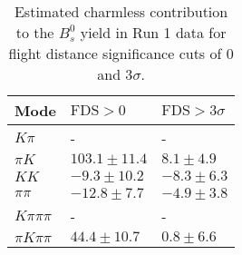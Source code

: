 \begin{table}[h]
  \centering
  \begin{tabular}{lll}
      \toprule
      Mode & $\mathrm{FDS} > 0$ & $\mathrm{FDS} > 3\sigma$ \\
      \midrule
      $K\pi$ & \-- & \-- \\
      $\pi K$ & $103.1 \pm 11.4$ & $8.1 \pm 4.9$ \\
      $KK$ & $-9.3 \pm 10.2$ & $-8.3 \pm 6.3$ \\
      $\pi\pi$ & $-12.8 \pm 7.7$ & $-4.9 \pm 3.8$ \\
      $K\pi\pi\pi$ & \-- & \-- \\
      $\pi K\pi\pi$ & $44.4 \pm 10.7$ & $0.8 \pm 6.6$ \\
      \bottomrule
  \end{tabular}
  \caption{\small Estimated charmless contribution to the $B^{0}_{s}$ yield in Run 1 data for flight distance significance cuts of 0  and $3\sigma$.}
\label{tab:charmless_yields_Bs_run_1}
\end{table}
